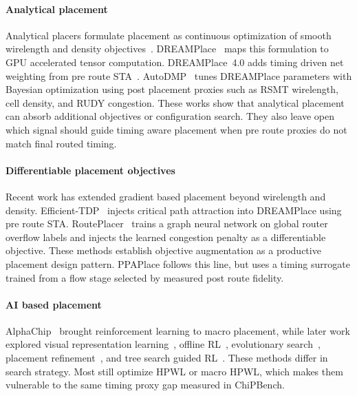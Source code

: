 \documentclass[sigconf,anonymous,review,9pt]{acmart}
\begin{document}
\paragraph{Analytical placement}
Analytical placers formulate placement as continuous optimization of
smooth wirelength and density objectives~\cite{lu2015eplace,
cheng2019replace}. DREAMPlace~\cite{lin2019dreamplace} maps this
formulation to GPU accelerated tensor computation. DREAMPlace~4.0
adds timing driven net weighting from pre route STA~\cite{dreamplace4}.
AutoDMP~\cite{autodmp2023} tunes DREAMPlace parameters with Bayesian
optimization using post placement proxies such as RSMT wirelength,
cell density, and RUDY congestion. These works show that analytical
placement can absorb additional objectives or configuration search.
They also leave open which signal should guide timing aware placement
when pre route proxies do not match final routed timing.

\paragraph{Differentiable placement objectives}
Recent work has extended gradient based placement beyond wirelength and
density. Efficient-TDP~\cite{efficienttdp2025} injects critical path
attraction into DREAMPlace using pre route STA. RoutePlacer~\cite{routeplacer2024}
trains a graph neural network on global router overflow labels and
injects the learned congestion penalty as a differentiable objective.
These methods establish objective augmentation as a productive
placement design pattern. PPAPlace follows this line, but uses a
timing surrogate trained from a flow stage selected by measured
post route fidelity.

\paragraph{AI based placement}
AlphaChip~\cite{mirhoseini2021graph} brought reinforcement learning to
macro placement, while later work explored visual representation
learning~\cite{lai2022maskplace}, offline RL~\cite{lai2023chipformer},
evolutionary search~\cite{shi2023wire}, placement
refinement~\cite{maskregulate2024}, and tree search guided
RL~\cite{efficientplace2024}. These methods differ in search strategy.
Most still optimize HPWL or macro HPWL, which makes them vulnerable to
the same timing proxy gap measured in ChiPBench.
\end{document}
